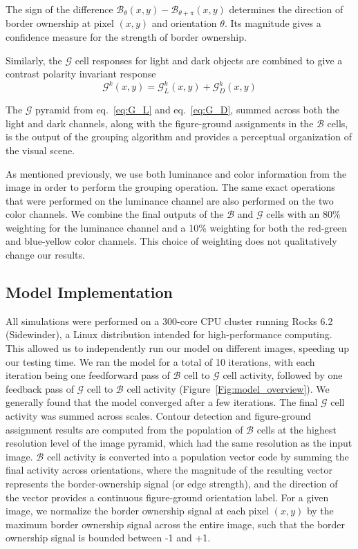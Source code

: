 The sign of the difference $\mathcal{B}_{\theta}(x,y)-\mathcal{B}_{\theta+\pi}(x,y)$ determines the direction of border ownership at pixel $(x,y)$ and orientation $\theta$. Its magnitude gives a confidence measure for the strength of border ownership.

Similarly, the $\mathcal{G}$ cell responses for light and dark objects are combined to give a contrast polarity invariant response
\begin{equation}
\mathcal{G}^k(x,y) =
\mathcal{G}^k_{L}(x,y)+\mathcal{G}^k_{D}(x,y)
\label{eq:G}
\end{equation}

The $\mathcal{G}$ pyramid from eq.~\ref{eq:G_L} and eq.~\ref{eq:G_D}, summed across both the light and dark channels, along with the figure-ground assignments in the $\mathcal{B}$ cells, is the output of the grouping algorithm and provides a perceptual organization of the visual scene.

As mentioned previously, we use both luminance and color information from the image in order to perform the grouping operation. The same exact operations that were performed on the luminance channel are also performed on the two color channels. We combine the final outputs of the $\mathcal{B}$ and $\mathcal{G}$ cells with an 80\% weighting for the luminance channel and a 10\% weighting for both the red-green and blue-yellow color channels. This choice of weighting does not qualitatively change our results.

\subsection{Model Implementation}
\label{sec:implementation}

All simulations were performed on a 300-core CPU cluster running Rocks 6.2 (Sidewinder), a Linux distribution intended for high-performance computing. This allowed us to independently run our model on different images, speeding up our testing time. We ran the model for a total of 10 iterations, with each iteration being one feedforward pass of $\mathcal{B}$ cell to $\mathcal{G}$ cell activity, followed by one feedback pass of $\mathcal{G}$ cell to $\mathcal{B}$ cell activity (Figure~\ref{Fig:model_overview}). We generally found that the model converged after a few iterations. The final $\mathcal{G}$ cell activity was summed across scales. Contour detection and figure-ground assignment results are computed from the population of $\mathcal{B}$ cells at the highest resolution level of the image pyramid, which had the same resolution as the input image. $\mathcal{B}$ cell activity is converted into a population vector code by summing the final activity across orientations, where the magnitude of the resulting vector represents the border-ownership signal (or edge strength), and the direction of the vector provides a continuous figure-ground orientation label. For a given image, we normalize the border ownership signal at each pixel $(x,y)$ by the maximum border ownership signal across the entire image, such that the border ownership signal is bounded between -1 and +1.

